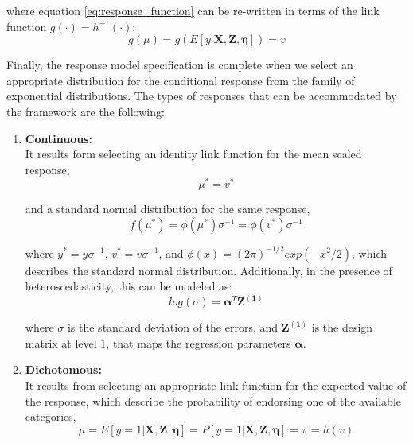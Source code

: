\noindent where equation \ref{eq:response_function} can be re-written in terms of the link function $g(\cdot) = h^{-1}(\cdot)$:
\begin{equation} \label{eq:link_function}
	g(\mu) = g(E[y | \mathbf{X}, \mathbf{Z}, \pmb{\eta}]) = v
\end{equation}

Finally, the response model specification is complete when we select an appropriate distribution for the conditional response from the family of exponential distributions. The types of responses that can be accommodated by the framework are the following:

\begin{enumerate}
	
	\item \textbf{Continuous:} \\
	It results form selecting an identity link function for the mean scaled response,
	\begin{equation} \label{eq:link_cont}
	\mu^{*} = v^{*}
	\end{equation}

	and a standard normal distribution for the same response,
	\begin{equation} \label{eq:dist_cont}
		f(\mu^{*}) = \phi(\mu^{*}) \sigma^{-1} = \phi(v^{*}) \sigma^{-1}
	\end{equation}

	where $y^{*} = y \sigma^{-1}$, $v^{*} = v \sigma^{-1}$, and $\phi(x) = (2 \pi )^{-1/2} exp(-x^{2}/2)$, which describes the standard normal distribution. Additionally, in the presence of heteroscedasticity, this can be modeled as:
	\begin{equation} \label{eq:het_cont}
		log(\sigma) = \pmb{\alpha}^{T}\mathbf{Z^{(1)}}
	\end{equation}
	
	where $\sigma$ is the standard deviation of the errors, and $\mathbf{Z^{(1)}}$ is the design matrix at level $1$, that maps the regression parameters $\pmb{\alpha}$.
	
	
	\item \textbf{Dichotomous:} \\
	It results from selecting an appropriate link function for the expected value of the response, which describe the probability of endorsing one of the available categories,
	\begin{equation} \label{eq:link_dich}
		\mu = E[y=1 | \mathbf{X}, \mathbf{Z}, \pmb{\eta}] = P[y=1 | \mathbf{X}, \mathbf{Z}, \pmb{\eta}] = \pi = h(v)
	\end{equation}
	

\end{enumerate}
